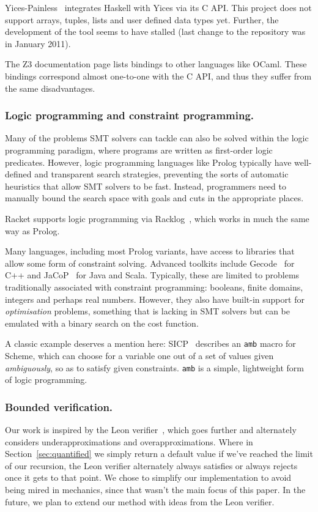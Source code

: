 Yices-Painless~\cite{yices-painless} integrates Haskell with Yices via its C
API. This project does not support arrays, tuples, lists and user defined data
types yet. Further, the development of the tool seems to have stalled (last
change to the repository was in January 2011).

The Z3 documentation page lists bindings to other languages like OCaml. These
bindings correspond almost one-to-one with the C API, and thus they suffer
from the same disadvantages.

\subsubsection{Logic programming and constraint programming.}

Many of the problems SMT solvers can tackle can also be solved within the
logic programming paradigm, where programs are written as first-order logic
predicates. However, logic programming languages like Prolog typically have
well-defined and transparent search strategies, preventing the sorts of
automatic heuristics that allow SMT solvers to be fast. Instead, programmers
need to manually bound the search space with goals and cuts in the appropriate
places.

Racket supports logic programming via Racklog~\cite{racklog}, which works in
much the same way as Prolog.

Many languages, including most Prolog variants, have access to libraries that
allow some form of constraint solving. Advanced toolkits include
Gecode~\cite{gecode} for C++ and JaCoP~\cite{JaCoP} for Java and Scala.
Typically, these are limited to problems traditionally associated with
constraint programming: booleans, finite domains, integers and perhaps real
numbers. However, they also have built-in support for \textit{optimisation}
problems, something that is lacking in SMT solvers but can be emulated with a
binary search on the cost function.

A classic example deserves a mention here: SICP~\cite[Section~4.3]{sicp}
describes an \texttt{amb} macro for Scheme, which can choose for a variable
one out of a set of values given \textit{ambiguously}, so as to satisfy given
constraints. \texttt{amb} is a simple, lightweight form of logic programming.

\subsubsection{Bounded verification.}

Our work is inspired by the Leon verifier~\cite{sat-recursive}, which goes
further and alternately considers underapproximations and overapproximations.
Where in Section~\ref{sec:quantified} we simply return a default value if
we've reached the limit of our recursion, the Leon verifier alternately always
satisfies or always rejects once it gets to that point. We chose to simplify
our implementation to avoid being mired in mechanics, since that wasn't the
main focus of this paper. In the future, we plan to extend our method with
ideas from the Leon verifier.
